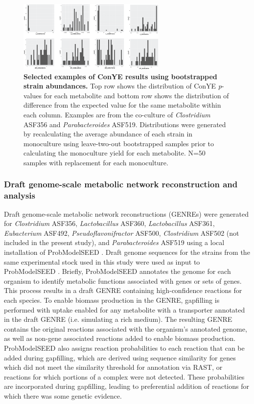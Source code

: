 \documentclass[11pt,onecolumn,notitlepage,openany,twoside]{book}
\begin{document}
\begin{refsection}
\begin{figure}[tb]
\centering
\includegraphics[width=0.65\textwidth]{ch2_figS4}
\caption[Selected examples of ConYE results using bootstrapped strain abundances.]{\textbf{Selected examples of ConYE results using bootstrapped strain abundances.} Top row shows the distribution of ConYE \textit{p}-values for each metabolite and bottom row shows the distribution of difference from the expected value for the same metabolite within each column. Examples are from the co-culture of \textit{Clostridium} ASF356 and \textit{Parabacteroides} ASF519. Distributions were generated by recalculating the average abundance of each strain in monoculture using leave-two-out bootstrapped samples prior to calculating the monoculture yield for each metabolite. N=50 samples with replacement for each monoculture.}
\end{figure}

\subsubsection{Draft genome-scale metabolic network reconstruction and analysis}

Draft genome-scale metabolic network reconstructions (GENREs) were generated for \textit{Clostridium} ASF356, \textit{Lactobacillus} ASF360, \textit{Lactobacillus} ASF361, \textit{Eubacterium} ASF492, \textit{Pseudoflavonifractor} ASF500, \textit{Clostridium} ASF502 (not included in the present study), and \textit{Parabacteroides} ASF519 using a local installation of ProbModelSEED \cite{Benedict2014-yo,Henry2010-um}. Draft genome sequences for the strains from the same experimental stock used in this study were used as input to ProbModelSEED \cite{Wannemuehler2014-cn}. Briefly, ProbModelSEED annotates the genome for each organism to identify metabolic functions associated with genes or sets of genes. This process results in a draft GENRE containing high-confidence reactions for each species. To enable biomass production in the GENRE, gapfilling is performed with uptake enabled for any metabolite with a transporter annotated in the draft GENRE (i.e. simulating a rich medium). The resulting GENRE contains the original reactions associated with the organism’s annotated genome, as well as non-gene associated reactions added to enable biomass production. ProbModelSEED also assigns reaction probabilities to each reaction that can be added during gapfilling, which are derived using sequence similarity for genes which did not meet the similarity threshold for annotation via RAST, or reactions for which portions of a complex were not detected. These probabilities are incorporated during gapfilling, leading to preferential addition of reactions for which there was some genetic evidence.


\end{refsection}
\end{document}
